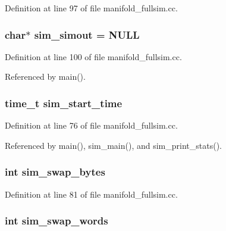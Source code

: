 Definition at line 97 of file manifold\_\-fullsim.cc.
\subsubsection[{sim\_\-simout}]{\setlength{\rightskip}{0pt plus 5cm}char$\ast$ {\bf sim\_\-simout} = NULL}\label{manifold__fullsim_8cc_09cbb844712d19de24f7ec8a414d4266}




Definition at line 100 of file manifold\_\-fullsim.cc.

Referenced by main().
\subsubsection[{sim\_\-start\_\-time}]{\setlength{\rightskip}{0pt plus 5cm}time\_\-t {\bf sim\_\-start\_\-time}}\label{manifold__fullsim_8cc_e8d0794b6bec1dfbd28ca90a7a08d2b4}




Definition at line 76 of file manifold\_\-fullsim.cc.

Referenced by main(), sim\_\-main(), and sim\_\-print\_\-stats().
\subsubsection[{sim\_\-swap\_\-bytes}]{\setlength{\rightskip}{0pt plus 5cm}int {\bf sim\_\-swap\_\-bytes}}\label{manifold__fullsim_8cc_feede3aab9267fb42b819ad7bc47247a}




Definition at line 81 of file manifold\_\-fullsim.cc.
\subsubsection[{sim\_\-swap\_\-words}]{\setlength{\rightskip}{0pt plus 5cm}int {\bf sim\_\-swap\_\-words}}\label{manifold__fullsim_8cc_a1267d1f1ee712bf4d37a9f7c4d2e913}




